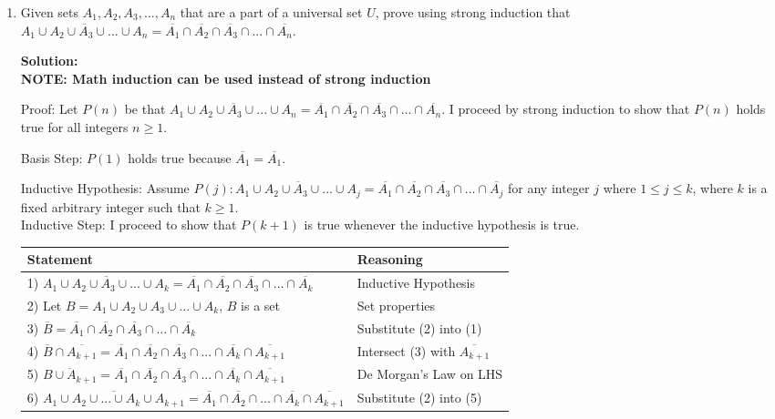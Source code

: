 \documentclass{article}
\newenvironment{solution}
{
\par
\color{blue}
\textbf{Solution:}
}
{
\par
}
\begin{document}
\begin{enumerate}
\begin{solution}
By math induction $P(n)$ is true for all $n \geq 1$.

\end{solution}


\item Given sets $A_1, A_2, A_3, ..., A_n$ that are a part of a universal set $U$, prove using strong induction that $\overline{A_1 \cup A_2 \cup A_3 \cup ... \cup A_n} = \overline{A_1} \cap \overline{A_2} \cap \overline{A_3} \cap ... \cap \overline{A_n}$.
\begin{solution}\\
\textbf{NOTE: Math induction can be used instead of strong induction}

Proof: Let $P(n)$ be that $\overline{A_1 \cup A_2 \cup A_3 \cup ... \cup A_n} = \overline{A_1} \cap \overline{A_2} \cap \overline{A_3} \cap ... \cap \overline{A_n}$. I proceed by strong induction to show that $P(n)$ holds true for all integers $n \geq 1$.

Basis Step: $P(1)$ holds true because $\overline{A_1} = \overline{A_1}$.

Inductive Hypothesis: Assume $P(j): \overline{A_1 \cup A_2 \cup A_3 \cup ... \cup A_j} = \overline{A_1} \cap \overline{A_2} \cap \overline{A_3} \cap ... \cap \overline{A_j}$ for any integer $j$ where $1 \leq j \leq k$, where $k$ is a fixed arbitrary integer such that $k \geq 1$.\\
Inductive Step: I proceed to show that $P(k + 1)$ is true whenever the inductive hypothesis is true.
\begin{center}
\begin{tabular}{l|l}
    Statement & Reasoning\\ \hline
    1) $\overline{A_1 \cup A_2 \cup A_3 \cup ... \cup A_k} =  \overline{A_1} \cap \overline{A_2} \cap \overline{A_3}     \cap ... \cap \overline{A_k}$ & Inductive Hypothesis\\
    2) Let $B = A_1 \cup A_2 \cup A_3 \cup ... \cup A_k$, $B$ is a set & Set properties\\
    3) $\overline{B} = \overline{A_1} \cap \overline{A_2} \cap \overline{A_3} \cap ... \cap \overline{A_k}$ & Substitute (2) into (1)\\
    4) $\overline{B} \cap \overline{A_{k+1}} = \overline{A_1} \cap \overline{A_2} \cap \overline{A_3} \cap ... \cap \overline{A_k} \cap \overline{A_{k+1}}$ & Intersect (3) with $\overline{A_{k+1}}$\\
    5) $\overline{B \cup A_{k+1}} = \overline{A_1} \cap \overline{A_2} \cap \overline{A_3} \cap ... \cap \overline{A_k} \cap \overline{A_{k+1}}$ & De Morgan's Law on LHS\\
    6) $\overline{A_1 \cup A_2 \cup ... \cup A_k \cup A_{k+1}} =  \overline{A_1} \cap \overline{A_2} \cap ... \cap \overline{A_k} \cap \overline{A_{k+1}}$ & Substitute (2) into (5)
\end{tabular}
\end{center}


\end{solution}
\end{enumerate}
\end{document}
